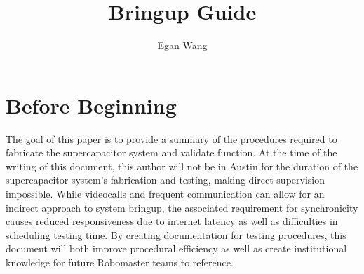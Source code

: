 \documentclass[]{report}
\title{Bringup Guide}
\author{Egan Wang}
\begin{document}
\maketitle

\tableofcontents
\pagebreak
\chapter{Before Beginning}
The goal of this paper is to provide a summary of the procedures required to fabricate the supercapacitor system and validate function. At the time of the writing of this document, this author will not be in Austin for the duration of the supercapacitor system's fabrication and testing, making direct supervision impossible. While videocalls and frequent communication can allow for an indirect approach to system bringup, the associated requirement for synchronicity causes reduced responsiveness due to internet latency as well as difficulties in scheduling testing time. By creating documentation for testing procedures, this document will both improve procedural efficiency as well as create institutional knowledge for future Robomaster teams to reference. 
\end{document}
